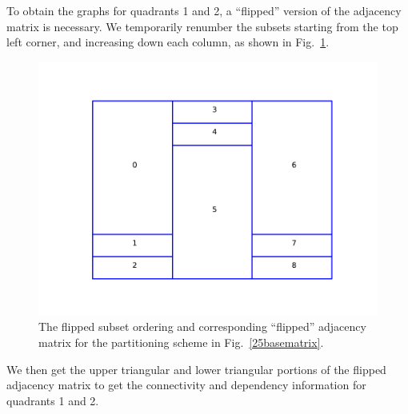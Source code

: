 To obtain the graphs for quadrants 1 and 2, a ``flipped'' version of the adjacency matrix is necessary.
We temporarily renumber the subsets starting from the top left corner, and increasing down each column, as shown in Fig.~\ref{25flippedmatrix}.
\begin{figure}[H]
\begin{minipage}[c]{0.5\textwidth}
\centering
\includegraphics[scale=0.7]{../../figures/boundaries_worst_flipped.pdf}
\end{minipage}
\begin{minipage}[c]{0.5\textwidth}
\centering
{}
\end{minipage}
\caption{The flipped subset ordering and corresponding ``flipped'' adjacency matrix for the partitioning scheme in Fig.~\ref{25basematrix}.}
\label{25flippedmatrix}
\end{figure}
We then get the upper triangular and lower triangular portions of the flipped adjacency matrix to get the connectivity and dependency information for quadrants 1 and 2.
